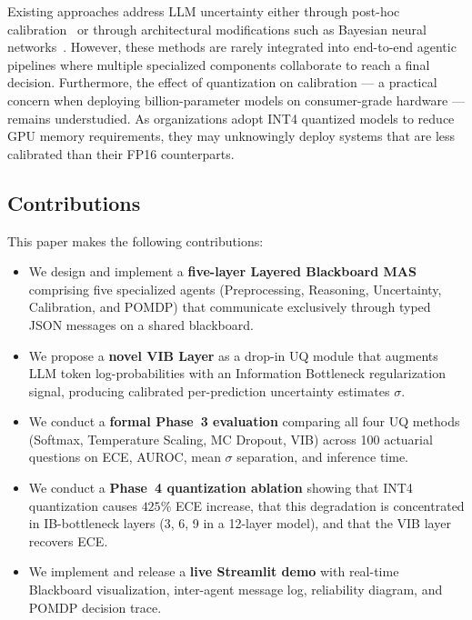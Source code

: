 \documentclass[conference]{IEEEtran}
\begin{document}
Existing approaches address LLM uncertainty either through post-hoc
calibration~\cite{platt1999probabilistic,temperature_scaling} or
through architectural modifications such as Bayesian neural
networks~\cite{blundell2015weight,kendall2017uncertainties}. However,
these methods are rarely integrated into end-to-end agentic pipelines
where multiple specialized components collaborate to reach a final
decision. Furthermore, the effect of quantization on calibration ---
a practical concern when deploying billion-parameter models on
consumer-grade hardware --- remains understudied. As organizations
adopt INT4 quantized models to reduce GPU memory requirements, they
may unknowingly deploy systems that are less calibrated than their
FP16 counterparts.

\subsection{Contributions}

This paper makes the following contributions:
\begin{itemize}[leftmargin=*]
    \item We design and implement a \textbf{five-layer Layered
          Blackboard MAS} comprising five specialized agents
          (Preprocessing, Reasoning, Uncertainty, Calibration, and
          POMDP) that communicate exclusively through typed JSON
          messages on a shared blackboard.
    \item We propose a \textbf{novel VIB Layer} as a drop-in UQ
          module that augments LLM token log-probabilities with an
          Information Bottleneck regularization signal, producing
          calibrated per-prediction uncertainty estimates $\sigma$.
    \item We conduct a \textbf{formal Phase~3 evaluation} comparing
          all four UQ methods (Softmax, Temperature Scaling, MC
          Dropout, VIB) across 100 actuarial questions on ECE, AUROC,
          mean $\sigma$ separation, and inference time.
    \item We conduct a \textbf{Phase~4 quantization ablation} showing
          that INT4 quantization causes $425\%$ ECE increase, that
          this degradation is concentrated in IB-bottleneck layers
          (3, 6, 9 in a 12-layer model), and that the VIB layer
          recovers ECE.
    \item We implement and release a \textbf{live Streamlit demo}
          with real-time Blackboard visualization, inter-agent message
          log, reliability diagram, and POMDP decision trace.
\end{itemize}
\end{document}
